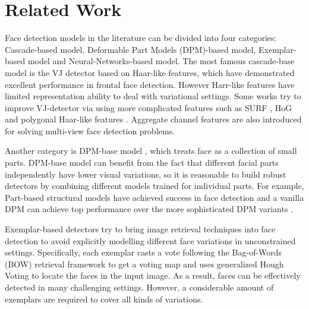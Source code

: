 \documentclass[10pt,twocolumn,letterpaper]{article}
\begin{document}
\section{Related Work}
Face detection models in the literature can be divided into four categories: Cascade-based model, Deformable Part Models (DPM)-based model, Exemplar-based model and Neural-Networks-based model. The most famous cascade-base model is the VJ detector \cite{viola2001rapid} based on Haar-like features, which have demonstrated excellent performance in frontal face detection. However Harr-like features have limited representation ability to deal with variational settings. Some works try to improve VJ-detector via using more complicated features such as SURF \cite{zhu2006fast}, HoG \cite{li2013learning} and polygonal Haar-like features \cite{pham2010fast}. Aggregate channel features \cite{yang2014aggregate} are also introduced for solving multi-view face detection problems.

Another category is DPM-base model \cite{felzenszwalb2010object}, which treats face as a collection of small parts. DPM-base model can benefit from the fact that different facial parts independently have lower visual variations, so it is reasonable to build robust detectors by combining different models trained for individual parts. For example, Part-based structural models \cite{yan2014face,zhu2012face,yan2014fastest} have achieved success in face detection and a vanilla DPM can achieve top performance over the more sophisticated DPM variants \cite{mathias2014face}.



Exemplar-based detectors \cite{shen2013detecting,li2014efficient,kumar2015visual} try to bring image retrieval techniques into face detection to avoid explicitly modelling different face variations in unconstrained settings. Specifically, each exemplar casts a vote following the Bag-of-Words (BOW) \cite{shekhar2012word} retrieval framework to get a voting map and uses generalized Hough Voting \cite{leibe2004combined} to locate the faces in the input image. As a result, faces can be effectively detected in many challenging settings. However, a considerable amount of exemplars are required to cover all kinds of variations.
\end{document}
